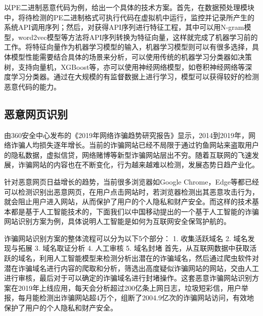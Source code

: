 以PE二进制恶意代码为例，给出一个具体的技术方案。首先，在数据预处理模块中，将待检测的PE二进制格式可执行代码在虚拟机中运行，监控并记录所产生的系统API调用序列；然后，对获得API序列进行特征工程，其中可以用N-gram模型，word2vec模型等方法将API序列转换为特征向量，这样就完成了机器学习前的工作。将特征向量作为机器学习模型的输入，机器学习模型则可以有很多选择，具体模型性能需要结合具体的场景来分析，可以使用传统的机器学习分类器如决策树，支持向量机，XGBoost等，亦可以使用神经网络模型，如卷积神经网络等深度学习分类器。通过在大规模的有监督数据上进行学习，模型可以获得较好的检测恶意代码的能力。

\subsection{恶意网页识别}
由360安全中心发布的《2019年网络诈骗趋势研究报告》显示，2014到2019年，网络诈骗人均损失逐年增长。当前的诈骗网站已经不局限于通过钓鱼网站来盗取用户的隐私数据，虚拟信贷，网络赌博等新型诈骗网站层出不穷。随着互联网的飞速发展，诈骗网站的内容也在不断变化，行为越来越难以检测，发展态势日趋产业化。

针对恶意网页日益增长的趋势，当前很多浏览器如Google Chrome，Edge等都已经可以检测识别出恶意网页，在用户点击网站时，若浏览器检测出其恶意攻击行为，就会阻止用户进入网站，从而保护了用户的个人隐私和财产安全。而这样的技术基本都是基于人工智能技术的，下面我们以中国移动提出的一个基于人工智能的诈骗网站识别方案为例，具体说明人工智能是如何为互联网安全保驾护航的。

诈骗网站识别方案的整体流程可以分为以下5个部分：
1. 收集活跃域名
2. 域名发现与拓展
3. 域名取证分析
4. 人工审核
5. 域名封堵
首先，从互联网数据中获取活跃的域名，利用人工智能模型来检测分析出潜在的诈骗域名，然后通过爬虫软件对潜在诈骗域名进行内容的爬取和分析，筛选出高度疑似诈骗网站的网站，交由人工进行审核，最后对于可以确定的诈骗域名进行封堵操作。这套恶意诈骗网站识别方案在2019年上线应用，每天会分析超过200亿条上网日志，垃圾短彩信，用户举报，每月能检测出诈骗网站超4万个，组断了2004.9亿次的诈骗网站访问，有效地保护了用户的个人隐私和财产安全。

